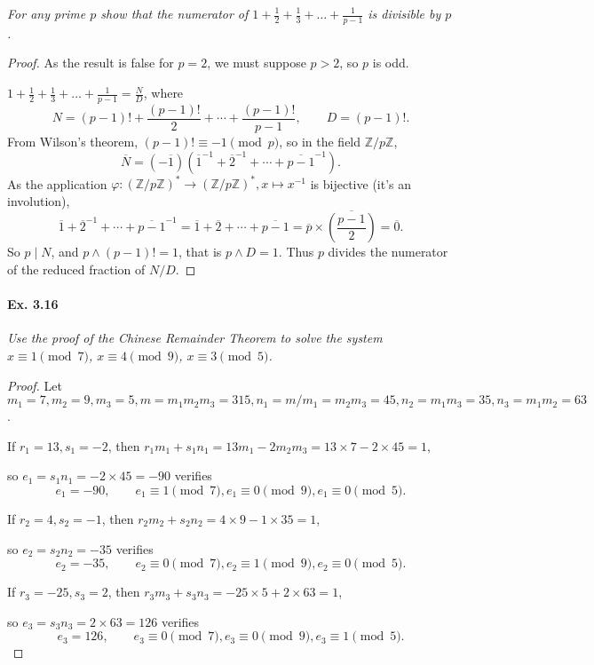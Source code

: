 \documentclass[11pt,a4paper]{article}
\newcommand{\Z}{\mathbb{Z}}
\begin{document}
{{\it For any prime $p$ show that the numerator of $1+ \frac{1}{2} + \frac{1}{3} + \ldots + \frac{1}{p-1}$ is divisible by $p$.
}

\begin{proof}
As the result is false for $p=2$, we must suppose $p>2$, so $p$ is odd.

$1+ \frac{1}{2} + \frac{1}{3} + \ldots + \frac{1}{p-1} = \frac{N}{D}$, where
$$ N = (p-1)! + \frac{(p-1)!}{2}+ \cdots+\frac{(p-1)!}{p-1}, \qquad D= (p-1)!.$$
From Wilson's theorem, $(p-1)! \equiv -1 \pmod p$, so in the field $\Z/p\Z$,
$$ \overline{N} = (-\overline{1})(\overline{1}^{-1} + \overline{2}^{-1}+\cdots+\overline{p-1}^{-1}).$$
As the application $\varphi : (\Z/p\Z)^* \to (\Z/p\Z)^*, x \mapsto x^{-1}$ is bijective (it's an involution), 
$$\overline{1} + \overline{2}^{-1}+\cdots+\overline{p-1}^{-1} = \overline{1} + \overline{2}+\cdots+\overline{p-1} = \overline{p} \times \overline{\left(  \frac{p-1}{2}\right)} = \overline{0}.$$
So $p \mid N $, and $p \wedge (p-1)! = 1$, that is $p\wedge D = 1$. Thus $p$ divides the numerator of the reduced fraction of $N/D$.
\end{proof}

\paragraph{Ex. 3.16}

{\it Use the proof of the Chinese Remainder Theorem to solve the system $x \equiv 1 \pmod 7$, $x \equiv 4 \pmod 9$, $x \equiv 3 \pmod 5$.
}

\begin{proof} Let $m_1 = 7,m_2=9,m_3 = 5, m = m_1m_2m_3 = 315, n_1 = m/m_1= m_2m_3=45, n_2 = m_1m_3 = 35, n_3= m_1m_2 = 63$.

If $r_1 = 13, s_1 = -2$, then $r_1m_1+s_1n_1 = 13 m_1 -2m_2m_3 = 13\times 7 -2 \times 45 = 1$,

so $e_1 = s_1n_1 = -2\times 45 = -90$ verifies $$e_1 = -90,\qquad e_1\equiv 1 \pmod 7, e_1 \equiv 0 \pmod 9, e_1 \equiv 0 \pmod 5.$$

If $r_2 = 4,s_2 = -1$, then $r_2m_2+s_2n_2 = 4\times9 - 1\times 35 = 1$,

so $ e_2 = s_2n_2 = -35$ verifies $$e_2 = -35, \qquad e_2 \equiv 0 \pmod 7, e_2 \equiv 1 \pmod 9, e_2 \equiv 0 \pmod 5.$$

If $r_3 = -25,s_3 = 2$, then $r_3m_3 +s_3n_3 = -25\times 5 + 2\times 63 = 1$,

so  $ e_3 = s_3 n _3 = 2\times 63 = 126$ verifies $$e_3 = 126, \qquad e_3\equiv 0\pmod 7, e_3 \equiv 0 \pmod 9, e_3 \equiv 1 \pmod 5.$$


\end{proof}}
\end{document}
